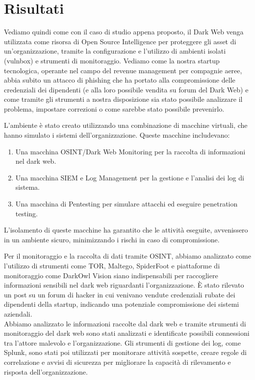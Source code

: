 \section{Risultati}\label{sec:cap_sec_caso5}

Vediamo quindi come con il caso di studio appena proposto, il Dark Web venga utilizzata come risorsa di Open Source Intelligence per proteggere gli asset di un'organizzazione, tramite la configurazione e l'utilizzo di ambienti isolati (vulnbox) e strumenti di monitoraggio. Vediamo come la nostra startup tecnologica, operante nel campo del revenue management per compagnie aeree, abbia subito un attacco di phishing che ha portato alla compromissione delle credenziali dei dipendenti (e alla loro possibile vendita su forum del Dark Web) e come tramite gli strumenti a nostra disposizione sia stato possibile analizzare il problema, impostare correzioni o come sarebbe stato possibile prevenirlo.

L'ambiente è stato creato utilizzando una combinazione di macchine virtuali, che hanno simulato i sistemi dell'organizzazione. Queste macchine includevano:

\begin{enumerate}
    \item Una macchina OSINT/Dark Web Monitoring per la raccolta di informazioni nel dark web.
    \item Una macchina SIEM e Log Management per la gestione e l'analisi dei log di sistema.
    \item Una macchina di Pentesting per simulare attacchi ed eseguire penetration testing.
\end{enumerate}

L'isolamento di queste macchine ha garantito che le attività eseguite, avvenissero in un ambiente sicuro, minimizzando i rischi in caso di compromissione.

Per il monitoraggio e la raccolta di dati tramite OSINT, abbiamo analizzato come l'utilizzo di strumenti come TOR, Maltego, SpiderFoot e piattaforme di monitoraggio come DarkOwl Vision siano indispensabili per raccogliere informazioni sensibili nel dark web riguardanti l'organizzazione.
È stato rilevato un post su un forum di hacker in cui venivano vendute credenziali rubate dei dipendenti della startup, indicando una potenziale compromissione dei sistemi aziendali.\\

Abbiamo analizzato le informazioni raccolte dal dark web e tramite strumenti di monitoraggio del dark web sono stati analizzati e identificate possibili connessioni tra l'attore malevolo e l'organizzazione.
Gli strumenti di gestione dei log, come Splunk, sono stati poi utilizzati per monitorare attività sospette, creare regole di correlazione e avvisi di sicurezza per migliorare la capacità di rilevamento e risposta dell'organizzazione.\\

